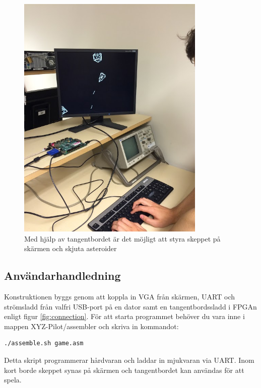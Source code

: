 \documentclass[a4paper]{article}
\begin{document}
    \begin{figure}[H]
        \centering
        \includegraphics[width=0.8\textwidth]{demo_img}
        \caption{Med hjälp av tangentbordet är det möjligt att styra skeppet på
        skärmen och skjuta asteroider\label{demo_img}}
    \end{figure}
	
	\subsection{Användarhandledning}
    Konstruktionen byggs genom att koppla in VGA från skärmen, UART och
    strömsladd från valfri USB-port på en dator samt en tangentbordssladd i
    FPGAn enligt figur \ref{fig:connection}. För att starta programmet behöver du vara inne i
    mappen XYZ-Pilot/assembler och skriva in kommandot:
    
    \begin{lstlisting}[language=bash]
    ./assemble.sh game.asm
    \end{lstlisting}
 
    Detta skript programmerar hårdvaran och laddar in mjukvaran via UART. Inom
    kort borde skeppet synas på skärmen och tangentbordet kan användas för att
    spela. 
\end{document}
